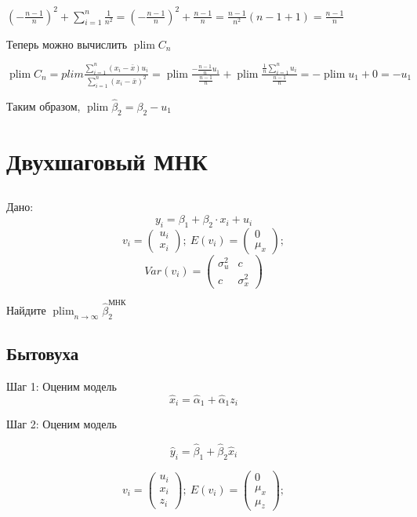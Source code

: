 \documentclass[10pt, a4paper]{extarticle}
\def \hb{\hat{\beta}}
\DeclareMathOperator{\plim}{plim}
\begin{document}
$ \left( -\frac{n-1}{n} \right)^2 + \sum_{i = 1}^n \frac{1}{n^2} = \left( -\frac{n-1}{n} \right)^2 + \frac{n-1}{n} = \frac{n-1}{n^2}(n - 1 + 1)  = \frac{n - 1}{n}$

Теперь можно вычислить $\plim C_n$

$\plim C_n = plim \frac{\sum_{i = 1}^n(x_i - \bar{x})u_i}{\sum_{i = 1}^n(x_i - \bar{x})^2} = 
\plim \frac{-\frac{n - 1}{n}u_1}{\frac{n-1}{n}} + \plim \frac{\frac{1}{n}\sum_{i = 1}^nu_i}{\frac{n - 1}{n}} = -\plim u_1 + 0 = -u_1$

Таким образом, $\plim \hb_2 = \beta_2 - u_1$
\section{Двухшаговый МНК}

\subsection{}

Дано: \[ y_{i} = \beta_{1} + \beta_{2} \cdot x_{i} + u_{i}\]
\[v_{i} = \begin{pmatrix}  u_{i} \\ x_{i} \end{pmatrix}; \ E(v_{i}) = \begin{pmatrix}  0 \\ \mu_{x} \end{pmatrix};
\]
\[
Var(v_{i}) = \begin{pmatrix}  \sigma_{u}^2 & c \\
c & \sigma_{x}^2 \end{pmatrix}
\]

Найдите $\plim_{n \to \infty} \hat \beta_{2}^{\text{МНК}}$


\subsection{Бытовуха}

Шаг 1: Оценим модель
\[
\hat{x}_i = \hat{\alpha}_1 + \hat{\alpha}_1 z_i
\]

Шаг 2: Оценим модель

\[
\hat{y}_i = \hb_1 + \hb_2 \hat{x}_i
\]

\[
v_{i} = \begin{pmatrix}  u_{i} \\ x_{i} \\  z_{i} \end{pmatrix}; \ E(v_{i}) = \begin{pmatrix}  0 \\ \mu_{x} \\ \mu_{z} \end{pmatrix};
\]
\end{document}
